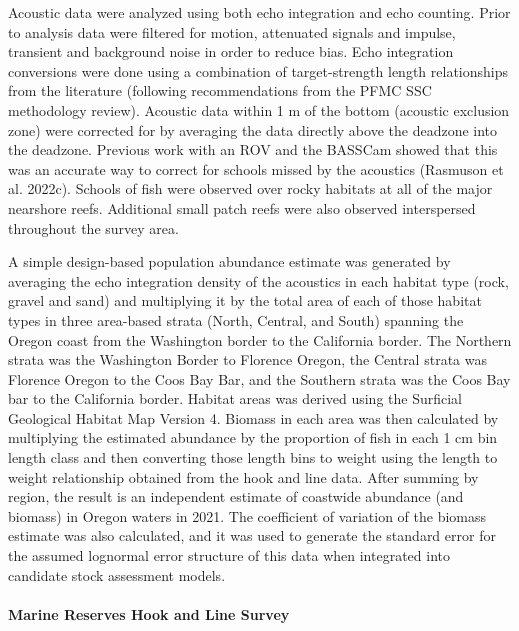 \documentclass[11pt,
  letterpaper,
]{article}
\begin{document}
Acoustic data were analyzed using both echo integration and echo counting. Prior to analysis data were filtered for motion, attenuated signals and impulse, transient and background noise in order to reduce bias. Echo integration conversions were done using a combination of target-strength length relationships from the literature (following recommendations from the PFMC SSC methodology review). Acoustic data within 1 m of the bottom (acoustic exclusion zone) were corrected for by averaging the data directly above the deadzone into the deadzone. Previous work with an ROV and the BASSCam showed that this was an accurate way to correct for schools missed by the acoustics (Rasmuson et al. 2022c). Schools of fish were observed over rocky habitats at all of the major nearshore reefs. Additional small patch reefs were also observed interspersed throughout the survey area.

A simple design-based population abundance estimate was generated by averaging the echo integration density of the acoustics in each habitat type (rock, gravel and sand) and multiplying it by the total area of each of those habitat types in three area-based strata (North, Central, and South) spanning the Oregon coast from the Washington border to the California border. The Northern strata was the Washington Border to Florence Oregon, the Central strata was Florence Oregon to the Coos Bay Bar, and the Southern strata was the Coos Bay bar to the California border. Habitat areas was derived using the Surficial Geological Habitat Map Version 4. Biomass in each area was then calculated by multiplying the estimated abundance by the proportion of fish in each 1 cm bin length class and then converting those length bins to weight using the length to weight relationship obtained from the hook and line data. After summing by region, the result is an independent estimate of coastwide abundance (and biomass) in Oregon waters in 2021. The coefficient of variation of the biomass estimate was also calculated, and it was used to generate the standard error for the assumed lognormal error structure of this data when integrated into candidate stock assessment models.

\hypertarget{marine-reserves-hook-and-line-survey}{%
\paragraph{Marine Reserves Hook and Line Survey}\label{marine-reserves-hook-and-line-survey}}
\end{document}
